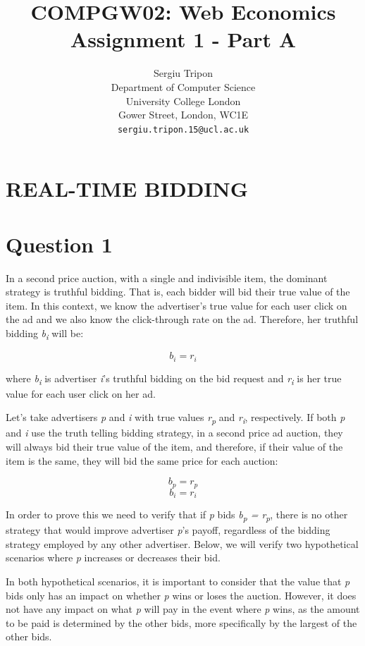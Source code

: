 \documentclass{article} %
\title{COMPGW02: Web Economics\\Assignment 1 - Part A}
\author{
Sergiu Tripon\\
Department of Computer Science\\
University College London\\
Gower Street, London, WC1E\\
\texttt{sergiu.tripon.15@ucl.ac.uk}\\
}
\begin{document}
\maketitle

\section{REAL-TIME BIDDING \cite{easley2010networks}}

\section*{Question 1}

In a second price auction, with a single and indivisible item, the dominant strategy is truthful bidding. That is, each bidder will bid their true value of the item. In this context, we know the advertiser's true value for each user click on the ad and we also know the click-through rate on the ad. Therefore, her truthful bidding \textit{b\textsubscript{i}} will be:

\[ b_i = r_i \]

where \textit{b\textsubscript{i}} is advertiser \textit{i}'s truthful bidding on the bid request and \textit{r\textsubscript{i}} is her true value for each user click on her ad.

Let's take advertisers \textit{p} and \textit{i} with true values \textit{r\textsubscript{p}} and \textit{r\textsubscript{i}}, respectively. If both \textit{p} and \textit{i} use the truth telling bidding strategy, in a second price ad auction, they will always bid their true value of the item, and therefore, if their value of the item is the same, they will bid the same price for each auction:

\[ b_p = r_p \]
\[ b_i = r_i \]

In order to prove this we need to verify that if \textit{p} bids \textit{b\textsubscript{p} = r\textsubscript{p}}, there is no other strategy that would improve advertiser \textit{p}'s payoff, regardless of the bidding strategy employed by any other advertiser. Below, we will verify two hypothetical scenarios where \textit{p} increases or decreases their bid.

In both hypothetical scenarios, it is important to consider that the value that \textit{p} bids only has an impact on whether \textit{p} wins or loses the auction. However, it does not have any impact on what \textit{p} will pay in the event where \textit{p} wins, as the amount to be paid is determined by the other bids, more specifically by the largest of the other bids.
\end{document}
